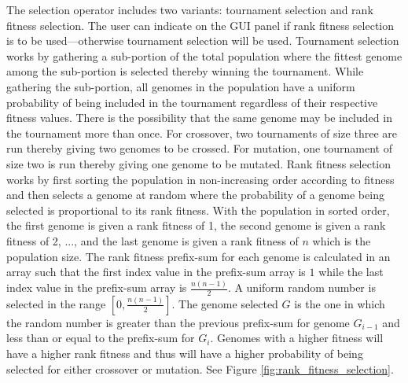 The selection operator includes two variants: tournament selection and rank fitness selection. The user can indicate on the GUI panel if rank fitness selection is to be used---otherwise tournament selection will be used. Tournament selection works by gathering a sub-portion of the total population where the fittest genome among the sub-portion is selected thereby winning the tournament. While gathering the sub-portion, all genomes in the population have a uniform probability of being included in the tournament regardless of their respective fitness values. There is the possibility that the same genome may be included in the tournament more than once. For crossover, two tournaments of size three are run thereby giving two genomes to be crossed. For mutation, one tournament of size two is run thereby giving one genome to be mutated. Rank fitness selection works by first sorting the population in non-increasing order according to fitness and then selects a genome at random where the probability of a genome being selected is proportional to its rank fitness. With the population in sorted order, the first genome is given a rank fitness of 1, the second genome is given a rank fitness of 2, ..., and the last genome is given a rank fitness of $n$ which is the population size. The rank fitness prefix-sum for each genome is calculated in an array such that the first index value in the prefix-sum array is $1$ while the last index value in the prefix-sum array is $\frac{n(n-1)}{2}$. A uniform random number is selected in the range $\left[0,\frac{n(n-1)}{2}\right]$. The genome selected $G$ is the one in which the random number is greater than the previous prefix-sum for genome $G_{i-1}$ and less than or equal to the prefix-sum for $G_i$. Genomes with a higher fitness will have a higher rank fitness and thus will have a higher probability of being selected for either crossover or mutation. See Figure \ref{fig:rank_fitness_selection}. 

\renewcommand{\baselinestretch}{1.0}

